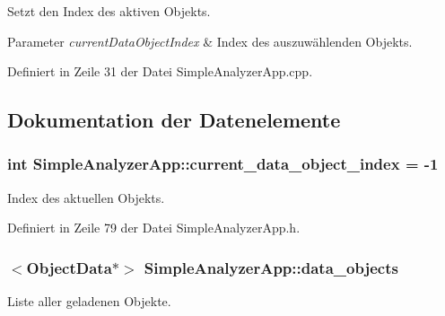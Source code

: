 Setzt den Index des aktiven Objekts. 


\begin{DoxyParams}{Parameter}
{\em current\-Data\-Object\-Index} & Index des auszuwählenden Objekts. \\
\hline
\end{DoxyParams}


Definiert in Zeile 31 der Datei Simple\-Analyzer\-App.\-cpp.



\subsection{Dokumentation der Datenelemente}
\hypertarget{classSimpleAnalyzerApp_a79ee2f69d43e2a32ba3c33c2560966e2}{
\subsubsection[{current\-\_\-data\-\_\-object\-\_\-index}]{\setlength{\rightskip}{0pt plus 5cm}int Simple\-Analyzer\-App\-::current\-\_\-data\-\_\-object\-\_\-index = -\/1\hspace{0.3cm}{\ttfamily [private]}}}\label{classSimpleAnalyzerApp_a79ee2f69d43e2a32ba3c33c2560966e2}


Index des aktuellen Objekts. 



Definiert in Zeile 79 der Datei Simple\-Analyzer\-App.\-h.

\hypertarget{classSimpleAnalyzerApp_a99bb49d6e0ec4d6f03ad08c29cf63288}{
\subsubsection[{data\-\_\-objects}]{$<${\bf Object\-Data}$\ast$$>$ Simple\-Analyzer\-App\-::data\-\_\-objects\hspace{0.3cm}{\ttfamily [private]}}}\label{classSimpleAnalyzerApp_a99bb49d6e0ec4d6f03ad08c29cf63288}


Liste aller geladenen Objekte. 



